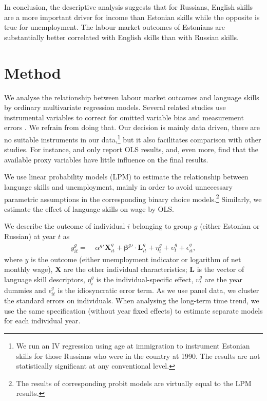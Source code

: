 \documentclass[12pt, a4paper]{article}
\renewcommand*{\vec}[1]{\boldsymbol{#1}}
\begin{document}
In conclusion, the descriptive analysis suggests that for Russians,
English skills are a more important driver for income than Estonian
skills while the opposite is true for unemployment.  The labour market
outcomes of Estonians are substantially better correlated with English
skills than with Russian skills.



\section{Method}
\label{sec:method}

We analyse the relationship between labour market outcomes and language
skills by ordinary multivariate regression models.
Several related studies use instrumental variables to correct for
omitted variable bias and measurement errors \citep{Chiswick1995, bleakley+chin2004}.
We refrain from doing that. Our decision is mainly data driven,
there are no suitable instruments in our data,\footnote{We run an IV
	regression using age at immigration to instrument Estonian skills
	for those Russians who were in the country at 1990.  The results are
	not statistically significant at any conventional level.} but it also facilitates
comparison with other studies.  For instance,
\citet{azam+2013EDandCC} and \citet{paolo+tansel2015JofDevStud} only
report OLS results, and, even more, find that the available proxy
variables have little influence on the final results.

We use linear probability models (LPM) to estimate the relationship between
language skills and unemployment, mainly in order to avoid unnecessary parametric
assumptions in the corresponding binary choice models.\footnote{The
	results of corresponding probit models are virtually equal to the LPM results.}
Similarly, we estimate the effect of language skills on wage by
OLS. 

We describe the outcome of individual $i$ belonging to group $g$ (either Estonian
or Russian) at year $t$ as
\begin{equation}
	\label{eq:specification}
	\begin{split}
		y_{it} ^{g} = &\: \alpha^{g}{}' \vec{X}_{it}^{g} + \vec{\beta}^{g}{}' \cdot \vec{L}_{it}^{g} +
		\eta_{i}^{g} +
		\upsilon_{t}^{g} + \epsilon_{it}^{g},
	\end{split}
\end{equation}
where $y$ is the outcome (either unemployment indicator
or logarithm of net monthly wage), $\vec{X}$ are the other individual
characteristics; $\vec{L}$ is the vector of
language skill descriptors, $\eta_{i}^{g}$ is the individual-specific effect, $\upsilon_{t}^{g}$ are the year dummies and $\epsilon_{it}^{g}$
is the idiosyncratic error term. 
As we use panel data, we cluster the
standard errors on individuals.  When analysing the long-term time
trend, we use the same specification (without year fixed effects) to
estimate separate models for each individual year.
\end{document}
